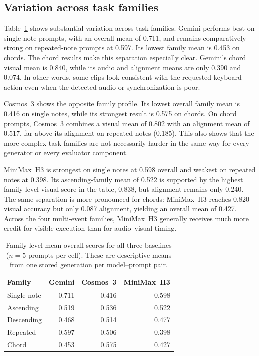 \documentclass{article}
\begin{document}
\subsection{Variation across task families}

Table~\ref{tab:family-summary} shows substantial variation across task families. Gemini performs best on single-note prompts, with an overall mean of 0.711, and remains comparatively strong on repeated-note prompts at 0.597. Its lowest family mean is 0.453 on chords. The chord results make this separation especially clear. Gemini's chord visual mean is 0.840, while its audio and alignment means are only 0.390 and 0.074. In other words, some clips look consistent with the requested keyboard action even when the detected audio or synchronization is poor.

Cosmos~3 shows the opposite family profile. Its lowest overall family mean is 0.416 on single notes, while its strongest result is 0.575 on chords. On chord prompts, Cosmos~3 combines a visual mean of 0.802 with an alignment mean of 0.517, far above its alignment on repeated notes (0.185). This also shows that the more complex task families are not necessarily harder in the same way for every generator or every evaluator component.

MiniMax~H3 is strongest on single notes at 0.598 overall and weakest on repeated notes at 0.398. Its ascending-family mean of 0.522 is supported by the highest family-level visual score in the table, 0.838, but alignment remains only 0.240. The same separation is more pronounced for chords: MiniMax~H3 reaches 0.820 visual accuracy but only 0.087 alignment, yielding an overall mean of 0.427. Across the four multi-event families, MiniMax~H3 generally receives much more credit for visible execution than for audio--visual timing.

\begin{table}[t]
  \caption{Family-level mean overall scores for all three baselines ($n=5$ prompts per cell). These are descriptive means from one stored generation per model--prompt pair.}
  \label{tab:family-summary}
  \centering
  \begin{tabular}{@{}lrrr@{}}
    \toprule
    Family & Gemini & Cosmos~3 & MiniMax~H3 \\
    \midrule
    Single note & 0.711 & 0.416 & 0.598 \\
    Ascending & 0.519 & 0.536 & 0.522 \\
    Descending & 0.468 & 0.514 & 0.477 \\
    Repeated & 0.597 & 0.506 & 0.398 \\
    Chord & 0.453 & 0.575 & 0.427 \\
    \bottomrule
  \end{tabular}
\end{table}
\end{document}
